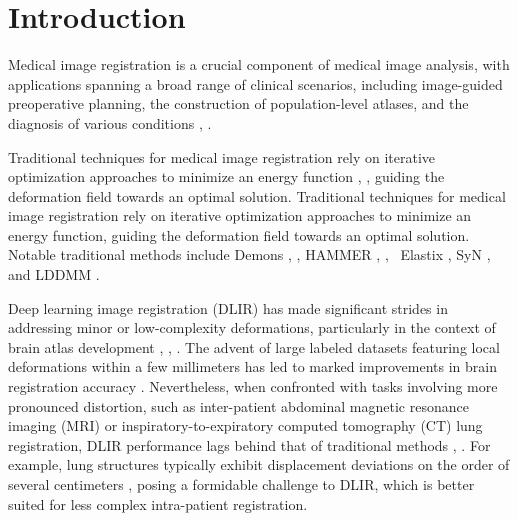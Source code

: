 \documentclass[preprint,review,12pt]{elsarticle}
\begin{document}
\section{Introduction}
\label{}
Medical image registration is a crucial component of medical image analysis, with applications spanning a broad range of clinical scenarios, including image-guided preoperative planning, the construction of population-level atlases, and the diagnosis of various conditions \cite{haskins2020deep}, \cite{lesterSurveyHierarchicalNonlinear1999}. 

Traditional techniques for medical image registration rely on iterative optimization approaches to minimize an energy function \cite{sengupta2022survey}, \cite{shenImageRegistrationLocal2007}, \cite{zheng2021progressive} guiding the deformation field towards an optimal solution. 
Traditional techniques for medical image registration rely on iterative optimization approaches to minimize an energy function, guiding the deformation field towards an optimal solution. Notable traditional methods include Demons \cite{vercauteren2009diffeomorphic}, \cite{LORENZI2013470}, HAMMER \cite{1175091}, \cite{SHEN2009954},  Elastix \cite{klein2009elastix}, SyN \cite{avants2008symmetric}, and LDDMM \cite{beg2005computing}. 

Deep learning image registration (DLIR) has made significant strides in addressing minor or low-complexity deformations, particularly in the context of brain atlas development \cite{fanBIRNet}, \cite{MSnet}, \cite{RecursiveC}. The advent of large labeled datasets featuring local deformations within a few millimeters has led to marked improvements in brain registration accuracy \cite{abbas2022}. Nevertheless, when confronted with tasks involving more pronounced distortion, such as inter-patient abdominal magnetic resonance imaging (MRI) or inspiratory-to-expiratory computed tomography (CT) lung registration, DLIR performance lags behind that of traditional methods \cite{7892934}, \cite{hansen2020tackling}. For example, lung structures typically exhibit displacement deviations on the order of several centimeters \cite{Heinrich2019ClosingTG}, posing a formidable challenge to DLIR, which is better suited for less complex intra-patient registration. 
\end{document}
